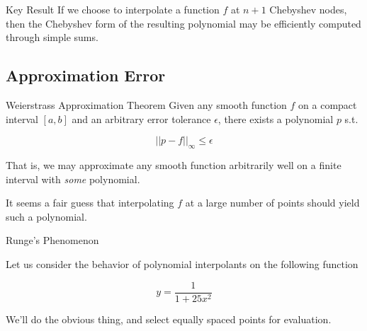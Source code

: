 \documentclass[pdf]{beamer}
\begin{document}
\begin{frame}{Key Result}
  If we choose to interpolate a function $f$ at $n+1$ Chebyshev nodes, then the
  Chebyshev form of the resulting polynomial may be efficiently computed through
  simple sums.
\end{frame}

\subsection{Approximation Error}

\begin{frame}{Weierstrass Approximation Theorem}
  Given any smooth function $f$ on a compact interval $[a,b]$ and an arbitrary
  error tolerance $\epsilon$, there exists a polynomial $p$ s.t.

  \[ ||p - f||_\infty \leq \epsilon \]

  That is, we may approximate any smooth function arbitrarily well on a finite interval
  with \emph{some} polynomial.\newline

  It seems a fair guess that interpolating $f$ at a large number of points should yield
  such a polynomial.
\end{frame}

\begin{frame}{Runge's Phenomenon}

  Let us consider the behavior of polynomial interpolants on the following function

  \[ y = \frac{1}{1 + 25x^2} \]

  We'll do the obvious thing, and select equally spaced points for evaluation.
  
\end{frame}
\end{document}
